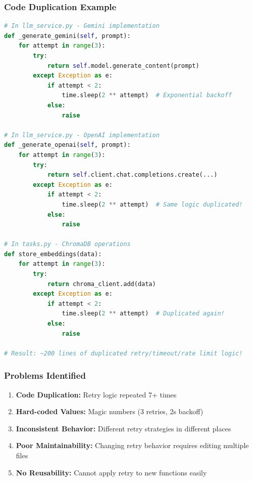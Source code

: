 \documentclass[11pt,a4paper]{article}
\begin{document}
\subsubsection{Code Duplication Example}

\begin{lstlisting}[language=Python, caption={Before: Duplicated Retry Logic}]
# In llm_service.py - Gemini implementation
def _generate_gemini(self, prompt):
    for attempt in range(3):
        try:
            return self.model.generate_content(prompt)
        except Exception as e:
            if attempt < 2:
                time.sleep(2 ** attempt)  # Exponential backoff
            else:
                raise

# In llm_service.py - OpenAI implementation
def _generate_openai(self, prompt):
    for attempt in range(3):
        try:
            return self.client.chat.completions.create(...)
        except Exception as e:
            if attempt < 2:
                time.sleep(2 ** attempt)  # Same logic duplicated!
            else:
                raise

# In tasks.py - ChromaDB operations
def store_embeddings(data):
    for attempt in range(3):
        try:
            return chroma_client.add(data)
        except Exception as e:
            if attempt < 2:
                time.sleep(2 ** attempt)  # Duplicated again!
            else:
                raise

# Result: ~200 lines of duplicated retry/timeout/rate limit logic!
\end{lstlisting}

\subsubsection{Problems Identified}

\begin{enumerate}
    \item \textbf{Code Duplication:} Retry logic repeated 7+ times
    \item \textbf{Hard-coded Values:} Magic numbers (3 retries, 2s backoff)
    \item \textbf{Inconsistent Behavior:} Different retry strategies in different places
    \item \textbf{Poor Maintainability:} Changing retry behavior requires editing multiple files
    \item \textbf{No Reusability:} Cannot apply retry to new functions easily
\end{enumerate}
\end{document}

